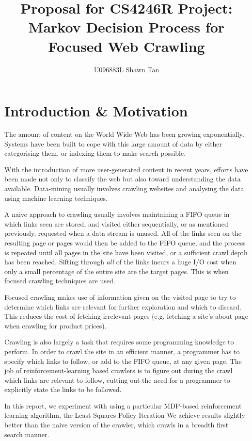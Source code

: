 \documentclass{article}[12 pt]
\title{Proposal for CS4246R Project:\\Markov Decision Process for Focused Web Crawling}
\author{U096883L Shawn Tan}
\begin{document}
\maketitle
\section{Introduction \& Motivation}
The amount of content on the World Wide Web has been growing exponentially. Systems have been built to cope with this large amount of data by either categorising them, or indexing them to make search possible.

With the introduction of more user-generated content in recent years, efforts have been made not only to classify the web but also toward understanding the data available. Data-mining usually involves crawling websites and analysing the data using machine learning techniques.

A naive approach to crawling usually involves maintaining a FIFO queue in which links seen are stored, and visited either sequentially, or as mentioned previously, requested when a data stream is unused. All of the links seen on the resulting page or pages would then be added to the FIFO queue, and the process is repeated until all pages in the site have been visited, or a sufficient crawl depth has been reached. Sifting through \emph{all} of the links incurs a huge I/O cost when only a small percentage of the entire site are the target pages. This is when focused crawling techniques are used.

Focused crawling makes use of information given on the visited page to try to determine which links are relevant for further exploration and which to discard. This reduces the cost of fetching irrelevant pages (e.g. fetching a site's about page when crawling for product prices).

Crawling is also largely a task that requires some programming knowledge to perform. In order to crawl the site in an efficient manner, a programmer has to specify which links to follow, or add to the FIFO queue, at any given page. The job of reinforcement-learning based crawlers is to figure out during the crawl which links are relevant to follow, cutting out the need for a programmer to explicitly state the links to be followed.

In this report, we experiment with using a particular MDP-based reinforcement learning algorithm, the Least-Squares Policy Iteration %
We achieve results slightly better than the naive version of the crawler, which crawls in a breadth first search manner.
\end{document}
